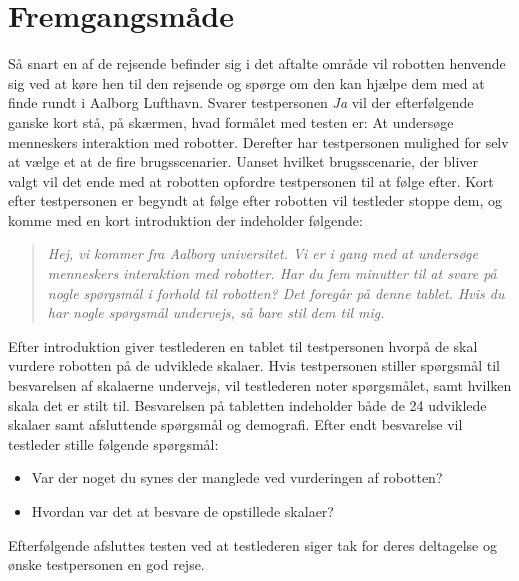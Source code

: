 \section{Fremgangsmåde}
\label{TestAfSkalaFremgangsmaade}
%
Så snart en af de rejsende befinder sig i det aftalte område vil robotten henvende sig ved at køre hen til den rejsende og spørge om den kan hjælpe dem med at finde rundt i Aalborg Lufthavn. Svarer testpersonen \textit{Ja} vil der efterfølgende ganske kort stå, på skærmen, hvad formålet med testen er: At undersøge menneskers interaktion med robotter.
Derefter har testpersonen mulighed for selv at vælge et at de fire brugsscenarier. Uanset hvilket brugsscenarie, der bliver valgt vil det ende med at robotten opfordre testpersonen til at følge efter. Kort efter testpersonen er begyndt at følge efter robotten vil testleder stoppe dem, og komme med en kort introduktion der indeholder følgende: 
%
\begin{quotation}
\noindent
\textit{Hej, vi kommer fra Aalborg universitet. Vi er i gang med at undersøge menneskers interaktion med robotter. Har du fem minutter til at svare på nogle spørgsmål i forhold til robotten? Det foregår på denne tablet. Hvis du har nogle spørgsmål undervejs, så bare stil dem til mig.}\\
\end{quotation}
%
Efter introduktion giver testlederen en tablet til testpersonen hvorpå de skal vurdere robotten på de udviklede skalaer. Hvis testpersonen stiller spørgsmål til besvarelsen af skalaerne undervejs, vil testlederen noter spørgsmålet, samt hvilken skala det er stilt til. \blankline
%
Besvarelsen på tabletten indeholder både de 24 udviklede skalaer samt afsluttende spørgsmål og demografi. \blankline
%
Efter endt besvarelse vil testleder stille følgende spørgsmål: 
\begin{itemize}
	\item Var der noget du synes der manglede ved vurderingen af robotten? 
	\item Hvordan var det at besvare de opstillede skalaer? 
\end{itemize} \blankline
%
Efterfølgende afsluttes testen ved at testlederen siger tak for deres deltagelse og ønske testpersonen en god rejse.